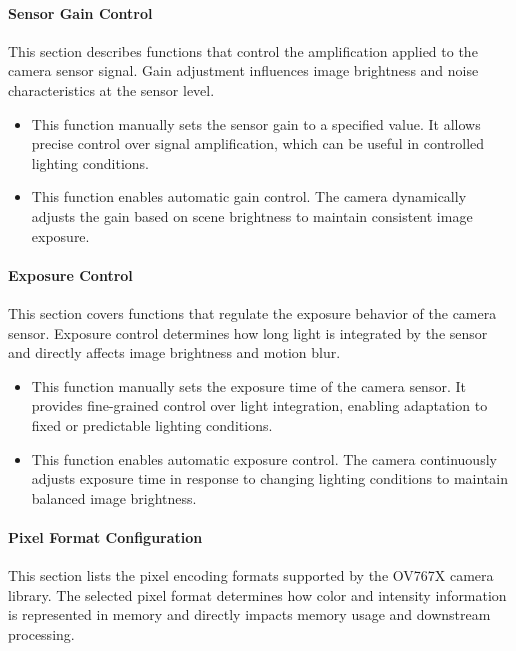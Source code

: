 \paragraph{Sensor Gain Control}
This section describes functions that control the amplification applied to the camera sensor signal. Gain adjustment influences image brightness and noise characteristics at the sensor level.

\begin{itemize}
	\item {} 
	
	This function manually sets the sensor gain to a specified value. It allows precise control over signal amplification, which can be useful in controlled lighting conditions.
	
	\item {} 
	
	This function enables automatic gain control. The camera dynamically adjusts the gain based on scene brightness to maintain consistent image exposure.
\end{itemize}



\paragraph{Exposure Control}
This section covers functions that regulate the exposure behavior of the camera sensor. Exposure control determines how long light is integrated by the sensor and directly affects image brightness and motion blur.

\begin{itemize}
	\item {} 
	
	This function manually sets the exposure time of the camera sensor. It provides fine-grained control over light integration, enabling adaptation to fixed or predictable lighting conditions.
	
	\item {} 
	
	This function enables automatic exposure control. The camera continuously adjusts exposure time in response to changing lighting conditions to maintain balanced image brightness.
\end{itemize}


\paragraph{Pixel Format Configuration}
This section lists the pixel encoding formats supported by the OV767X camera library. The selected pixel format determines how color and intensity information is represented in memory and directly impacts memory usage and downstream processing.


